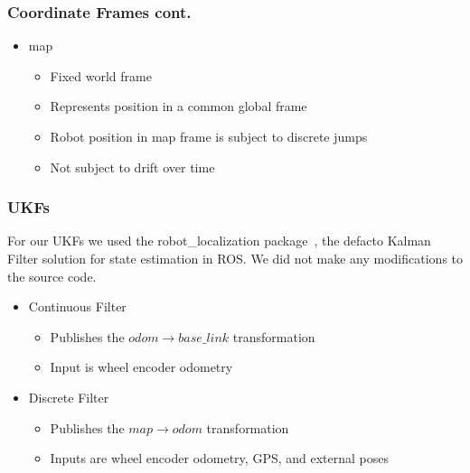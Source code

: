 \documentclass[14pt]{beamer}
\begin{document}
\begin{frame}
\frametitle{Coordinate Frames cont.}
\begin{itemize}
\item map
    \begin{itemize}
    \item Fixed world frame
    \item Represents position in a common global frame
    \item Robot position in map frame is subject to discrete jumps
    \item Not subject to drift over time
    \end{itemize}
\end{itemize}
\end{frame}

\begin{frame}
\frametitle{UKFs}
For our UKFs we used the robot\_localization package~\cite{MooreStouch2014, Moore}, the defacto Kalman Filter solution for state estimation in ROS. We did not make any modifications to the source code.
\pause
\begin{itemize}
\item Continuous Filter
    \begin{itemize}
    \item Publishes the $odom \rightarrow base\_link$ transformation
    \item Input is wheel encoder odometry
    \end{itemize}
\pause
\item Discrete Filter
    \begin{itemize}
    \item Publishes the $map \rightarrow odom$ transformation
    \item Inputs are wheel encoder odometry, GPS, and external poses
    \end{itemize}
\end{itemize}
\end{frame}
\end{document}
